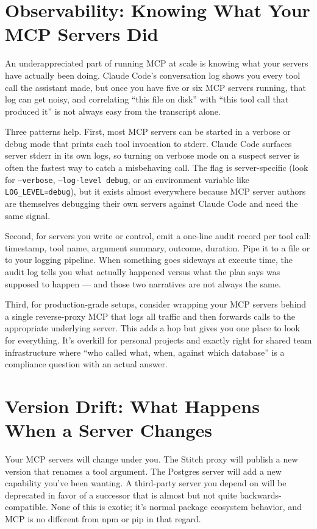 \documentclass[11pt,letterpaper,openany]{book}
\begin{document}
\section{Observability: Knowing What Your MCP Servers Did}

An underappreciated part of running MCP at scale is knowing what
your servers have actually been doing. Claude Code's conversation
log shows you every tool call the assistant made, but once you have
five or six MCP servers running, that log can get noisy, and
correlating ``this file on disk'' with ``this tool call that
produced it'' is not always easy from the transcript alone.

Three patterns help. First, most MCP servers can be started in a
verbose or debug mode that prints each tool invocation to stderr.
Claude Code surfaces server stderr in its own logs, so turning on
verbose mode on a suspect server is often the fastest way to catch
a misbehaving call. The flag is server-specific (look for
\texttt{--verbose}, \texttt{--log-level debug}, or an environment
variable like \texttt{LOG\_LEVEL=debug}), but it exists almost
everywhere because MCP server authors are themselves debugging
their own servers against Claude Code and need the same signal.

Second, for servers you write or control, emit a one-line audit
record per tool call: timestamp, tool name, argument summary, outcome,
duration. Pipe it to a file or to your logging pipeline. When
something goes sideways at execute time, the audit log tells you
what actually happened versus what the plan says was supposed to
happen --- and those two narratives are not always the same.

Third, for production-grade setups, consider wrapping your MCP
servers behind a single reverse-proxy MCP that logs all traffic
and then forwards calls to the appropriate underlying server. This
adds a hop but gives you one place to look for everything. It's
overkill for personal projects and exactly right for shared team
infrastructure where ``who called what, when, against which
database'' is a compliance question with an actual answer.

\section{Version Drift: What Happens When a Server Changes}

Your MCP servers will change under you. The Stitch proxy will
publish a new version that renames a tool argument. The Postgres
server will add a new capability you've been wanting. A third-party
server you depend on will be deprecated in favor of a successor
that is almost but not quite backwards-compatible. None of this is
exotic; it's normal package ecosystem behavior, and MCP is no
different from npm or pip in that regard.
\end{document}
